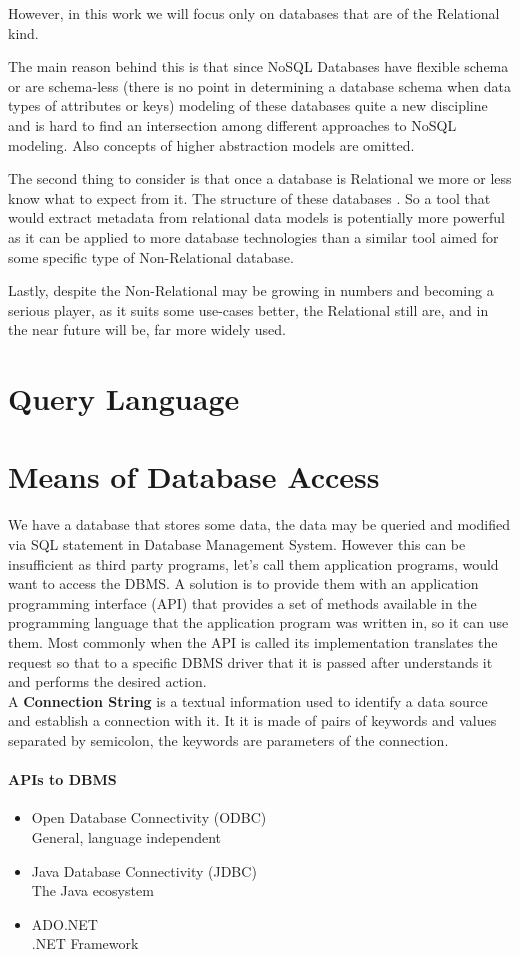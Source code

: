 
However, in this work we will focus only on databases that are of the Relational kind. 

The main reason behind this is that since NoSQL Databases have flexible schema or are schema-less (there is no point in determining a database schema when data types of attributes or keys) modeling of these databases quite a new discipline and is hard to find an intersection among different approaches to NoSQL modeling.
Also concepts of higher abstraction models are omitted. \cite{NoSQLDatabaseModeling}

The second thing to consider is that once a database is Relational we more or less know what to expect from it. The structure of these databases . So a tool that would extract metadata from relational data models is potentially more powerful as it can be applied to more database technologies than a similar tool aimed for some specific type of Non-Relational database. 

Lastly, despite the Non-Relational may be growing in numbers and becoming a serious player, as it suits some use-cases better, the Relational still are, and in the near future will be, far more widely used.

\section{Query Language}


\section{Means of Database Access}

We have a database that stores some data, the data may be queried and modified via SQL statement in Database Management System. However this can be insufficient as third party programs, let's call them application programs, would want to access the DBMS. 
A solution is to provide them with an application programming interface (API) that provides a set of methods available in the programming language that the application program was written in, so it can use them.
Most commonly when the API is called its implementation translates the request so that to a specific DBMS driver that it is passed after understands it and performs the desired action. \\

A \textbf{Connection String} is a textual information used to identify a data source and establish a connection with it. It it is made of pairs of keywords and values separated by semicolon, the keywords are parameters of the connection.

\paragraph{APIs to DBMS}
\begin{itemize}
	\item Open Database Connectivity (ODBC)\\
		General, language independent
	\item Java Database Connectivity (JDBC)\\
		The Java ecosystem
	\item ADO.NET\\
		.NET Framework
\end{itemize}
